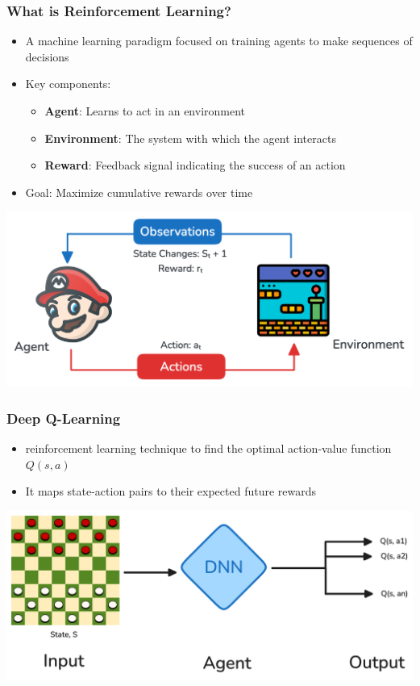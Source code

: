 \begin{frame}
	\frametitle{What is Reinforcement Learning?}
	\vspace{0.2cm}
	\begin{itemize}
		\item A machine learning paradigm focused on training agents to make sequences of decisions
		\item Key components:
		\begin{itemize}
			\item \textbf{Agent}: Learns to act in an environment
			\item \textbf{Environment}: The system with which the agent interacts
			\item  \textbf{Reward}: Feedback signal indicating the success of an action
		\end{itemize}
		\item Goal: Maximize cumulative rewards over time
	\end{itemize}
	\centering
	\includegraphics[scale=0.25]{rl_agent_env}
\end{frame}



\begin{frame}
	\frametitle{Deep Q-Learning}
	\vspace{0.5cm}
		\begin{itemize}	
			\item reinforcement learning technique to find the optimal action-value function $Q(s,a)$
			\item It maps state-action pairs to their expected future rewards
		\end{itemize}
		 \centering
		\includegraphics[scale=0.15]{dqn_checkers}
			
\end{frame}

